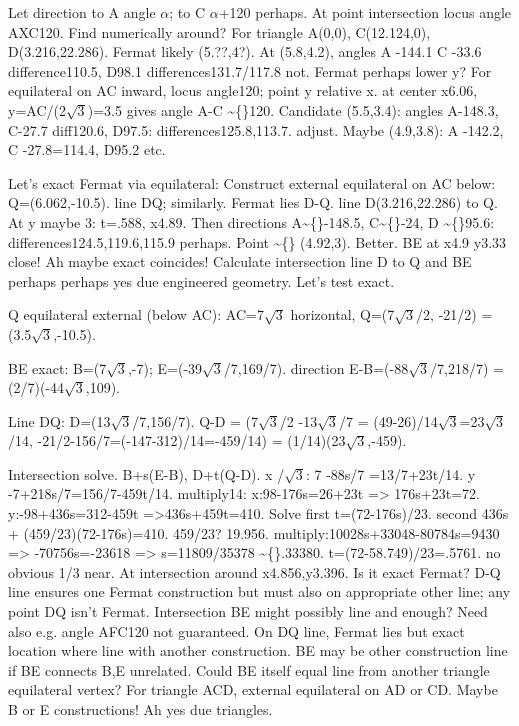\begin{decodedreasoningpanel}
Let direction to A angle \ensuremath{\alpha}; to C \ensuremath{\alpha}+120 perhaps. At point intersection locus angle AXC120. Find numerically around? For triangle A(0,0), C(12.124,0), D(3.216,22.286). Fermat likely (5.??,4?). At (5.8,4.2), angles A -144.1 C -33.6 difference110.5, D98.1 differences131.7/117.8 not. Fermat perhaps lower y? For equilateral on AC inward, locus angle120; point y relative x. at center x6.06, y=AC/(2\ensuremath{\sqrt{3}})=3.5 gives angle A-C \textasciitilde\{\}120. Candidate (5.5,3.4): angles A-148.3, C-27.7 diff120.6, D97.5: differences125.8,113.7. adjust.
Maybe (4.9,3.8): A -142.2, C -27.8=114.4, D95.2 etc.

Let's exact Fermat via equilateral: Construct external equilateral on AC below: Q=(6.062,-10.5). line DQ; similarly. Fermat lies D-Q. line D(3.216,22.286) to Q. At y maybe 3: t=.588, x4.89. Then directions A\textasciitilde\{\}-148.5, C\textasciitilde\{\}-24, D
  \textasciitilde\{\}95.6: differences124.5,119.6,115.9 perhaps. Point \textasciitilde\{\} (4.92,3). Better. BE at x4.9 y3.33 close! Ah maybe exact coincides! Calculate intersection line D to Q and BE perhaps perhaps yes due engineered geometry. Let's test exact.

Q equilateral external (below AC): AC=7\ensuremath{\sqrt{3}} horizontal, Q=(7\ensuremath{\sqrt{3}}/2, -21/2) = (3.5\ensuremath{\sqrt{3}},-10.5).

BE exact:
B=(7\ensuremath{\sqrt{3}},-7); E=(-39\ensuremath{\sqrt{3}}/7,169/7).
direction E-B=(-88\ensuremath{\sqrt{3}}/7,218/7) = (2/7)(-44\ensuremath{\sqrt{3}},109).

Line DQ:
D=(13\ensuremath{\sqrt{3}}/7,156/7).
Q-D = (7\ensuremath{\sqrt{3}}/2 -13\ensuremath{\sqrt{3}}/7 = (49-26)/14\ensuremath{\sqrt{3}}=23\ensuremath{\sqrt{3}}/14, -21/2-156/7=(-147-312)/14=-459/14) = (1/14)(23\ensuremath{\sqrt{3}},-459).

Intersection solve. B+s(E-B), D+t(Q-D).
x /\ensuremath{\sqrt{3}}: 7 -88s/7 =13/7+23t/14.
y -7+218s/7=156/7-459t/14.
multiply14:
x:98-176s=26+23t =\textgreater{} 176s+23t=72.
y:-98+436s=312-459t =\textgreater{}436s+459t=410.
Solve first t=(72-176s)/23. second 436s + (459/23)(72-176s)=410. 459/23? 19.956.
multiply:10028s+33048-80784s=9430 =\textgreater{} -70756s=-23618 =\textgreater{} s=11809/35378 \textasciitilde\{\}.33380. t=(72-58.749)/23=.5761. no obvious 1/3 near. At intersection around x4.856,y3.396. Is it exact Fermat? D-Q line ensures one Fermat construction but must also on appropriate other line; any point DQ isn't Fermat. Intersection BE might possibly line and enough? Need also e.g. angle AFC120 not guaranteed. On DQ line, Fermat lies but exact location where line with another construction. BE may be other construction line if
  BE connects B,E unrelated. Could BE itself equal line from another triangle equilateral vertex? For triangle ACD, external equilateral on AD or CD. Maybe B or E constructions! Ah yes due triangles.


\end{decodedreasoningpanel}
